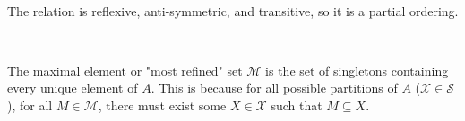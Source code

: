 \documentclass{article}
\begin{document}
\

The relation is reflexive, anti-symmetric, and transitive, so it is a partial ordering.

\

The maximal element or "most refined" set $\mathcal{M}$ is the set of singletons containing every unique element of $A$. This is because for all possible partitions of $A$ ($\mathcal{X} \in \mathcal{S}$), for all $M\in \mathcal{M}$, there must exist some $X\in \mathcal{X}$ such that $M\subseteq X$. 

\
\hline
\end{document}
